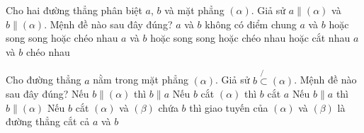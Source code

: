 

\begin{ex}%
	Cho hai đường thẳng phân biệt $ a$, $b$ và mặt phẳng $( \alpha)$. Giả sử $ a \parallel ( \alpha)$ và $ b \parallel ( \alpha)$. Mệnh đề nào sau  đây đúng?
	 \choice
		{ $ a$ và $ b$ không có điểm  chung}
		 { $ a$ và $ b$ hoặc song song hoặc chéo nhau}
		{\True  $ a$ và $ b$ hoặc song song hoặc chéo nhau hoặc cắt nhau}
		{ $ a$  và $ b$ chéo nhau}
\end{ex}

\begin{ex}%
	Cho đường thẳng $ a$ nằm trong mặt phẳng $( \alpha)$. Giả sử  $ b\not{ \subset }( \alpha)$. Mệnh đề nào sau đây đúng?
	 \choice
		{Nếu $ b \parallel ( \alpha)$ thì $  b \parallel a $}
		{Nếu $ b$ cắt $( \alpha)$ thì $ b$ cắt  $ a $}
		{\True Nếu $ b \parallel  a$ thì $ b \parallel ( \alpha) $}
		{Nếu $ b$ cắt $( \alpha)$ và $( \beta)$ chứa $ b$ thì giao tuyến của $( \alpha)$ và $( \beta)$ là đường  thẳng cắt cả $ a$ và $ b $}
\end{ex}

